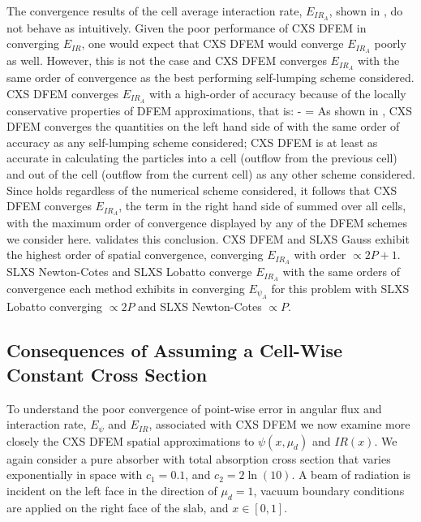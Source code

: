 The convergence results of the cell average interaction rate, $E_{IR_A}$, shown in , do not behave as intuitively.  Given the poor performance of CXS DFEM in converging $E_{IR}$, one would expect that CXS DFEM would converge $E_{IR_A}$ poorly as well.  
However, this is not the case and CXS DFEM converges $E_{IR_A}$ with the same order of convergence as the best performing self-lumping scheme considered.
CXS DFEM converges $E_{IR_A}$ with a high-order of accuracy because of the locally conservative properties of DFEM approximations, that is:
\benum
{} -  =   \pep
\label{eq:balance}
\eenum
As shown in , CXS DFEM converges the quantities on the left hand side of  with the same order of accuracy as any self-lumping scheme considered; CXS DFEM is at least as accurate in calculating the particles into a cell (outflow from the previous cell) and out of the cell (outflow from the current cell) as any other scheme considered.
Since  holds regardless of the numerical scheme considered, it follows that CXS DFEM converges $E_{IR_A}$, the term in the right hand side of  summed over all cells, with the maximum order of convergence displayed by any of the DFEM schemes we consider here.
 validates this conclusion.
CXS DFEM and SLXS Gauss exhibit the highest order of spatial convergence, converging $E_{IR_A}$ with order $\propto 2P + 1$.  
SLXS Newton-Cotes and SLXS Lobatto converge $E_{IR_A}$ with the same orders of convergence each method exhibits in converging $E_{\psi_A}$ for this problem with SLXS Lobatto converging $\propto 2P$ and SLXS Newton-Cotes $\propto P$.

\subsection{Consequences of Assuming a Cell-Wise Constant Cross Section}

To understand the poor convergence of point-wise error in angular flux and interaction rate, $E_{\psi}$ and $E_{IR}$, associated with CXS DFEM  we now examine more closely the CXS DFEM spatial approximations to $\psi(x,\mu_d)$ and $IR(x)$. 
We again consider a pure absorber with total absorption cross section that varies exponentially in space with $c_1 = 0.1$, and $c_2 = 2\ln(10)$.  
A beam of radiation is incident on the left face in the direction of $\mu_d=1$, vacuum boundary conditions are applied on the right face of the slab, and $x\in[0, 1]$.    

